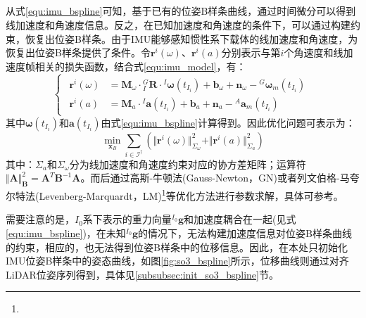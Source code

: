 \subsection{}
从式\ref{equ:imu_bspline}可知，基于已有的位姿B样条曲线，通过时间微分可以得到线加速度和角速度信息。反之，在已知加速度和角速度的条件下，可以通过构建约束，恢复出位姿B样条。由于IMU能够感知惯性系下载体的线加速度和角速度，为恢复出位姿B样条提供了条件。令$\boldsymbol{r}^i(\omega)$、$\boldsymbol{r}^i(a)$分别表示与第$i$个角速度和线加速度帧相关的损失函数，结合式\ref{equ:imu_model}，有：
\begin{equation}
  \label{equ:imu_const}
  \begin{cases}
    \begin{aligned}
      \boldsymbol{r}^i(\omega) & =\boldsymbol{M}_\omega\cdot{^{G}_{I}\boldsymbol{R}}\cdot{^{I}}\boldsymbol{\omega}(t_{I_i})+\boldsymbol{b}_\omega+\boldsymbol{n}_\omega-{^{G}}\boldsymbol{\omega}_m(t_{I_i}) \\
      \boldsymbol{r}^i(a)      & =\boldsymbol{M}_a\cdot{^{I}}\boldsymbol{a}(t_{I_i})+\boldsymbol{b}_a+\boldsymbol{n}_a-{^{A}}\boldsymbol{a}_m(t_{I_i})
    \end{aligned}
  \end{cases}
\end{equation}
其中$\boldsymbol{\omega}(t_{I_i})$和$\boldsymbol{a}(t_{I_i})$由式\ref{equ:imu_bspline}计算得到。因此优化问题可表示为：
\begin{equation}
  \min_{\boldsymbol{x}_B} \sum_{i\in\mathcal{I}^\dagger}\left( \Vert\boldsymbol{r}^i(\omega)\Vert^2_{\Sigma_\omega}+\Vert\boldsymbol{r}^i(a)\Vert^2_{\Sigma_a}\right)
\end{equation}
其中：$\Sigma_a$和$\Sigma_\omega$分为线加速度和角速度约束对应的协方差矩阵；运算符$\Vert\boldsymbol{A}\Vert^2_{\boldsymbol{B}}=\boldsymbol{A}^T\boldsymbol{B}^{-1}\boldsymbol{A}$。而后通过高斯-牛顿法(Gauss-Newton，GN)或者列文伯格-马夸尔特法(Levenberg-Marquardt，LM)\footnote{}等优化方法进行参数求解，具体可参考\cite{barfoot2017state}。

需要注意的是，$I_0$系下表示的重力向量${^{I_0}\boldsymbol{g}}$和加速度耦合在一起(见式\ref{equ:imu_bspline})，在未知${^{I_0}\boldsymbol{g}}$的情况下，无法构建加速度信息对位姿B样条曲线的约束，相应的，也无法得到位姿B样条中的位移信息。因此，在本处只初始化IMU位姿B样条中的姿态曲线，如图\ref{fig:so3_bspline}所示，位移曲线则通过对齐LiDAR位姿序列得到，具体见\ref{subsubsec:init_so3_bspline}节。

